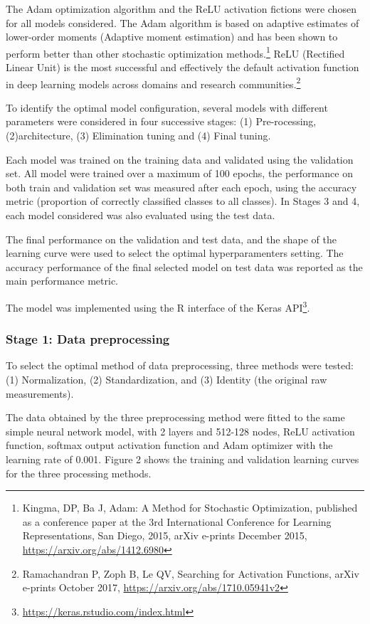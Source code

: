 \documentclass[]{article}
\let\rmarkdownfootnote\footnote%
\def\footnote{\protect\rmarkdownfootnote}
\begin{document}
The Adam optimization algorithm and the ReLU activation fictions were
chosen for all models considered. The Adam algorithm is based on
adaptive estimates of lower-order moments (Adaptive moment estimation)
and has been shown to perform better than other stochastic optimization
methods.\footnote{Kingma, DP, Ba J, Adam: A Method for Stochastic
  Optimization, published as a conference paper at the 3rd International
  Conference for Learning Representations, San Diego, 2015, arXiv
  e-prints December 2015, \url{https://arxiv.org/abs/1412.6980}} ReLU
(Rectified Linear Unit) is the most successful and effectively the
default activation function in deep learning models across domains and
research communities.\footnote{Ramachandran P, Zoph B, Le QV, Searching
  for Activation Functions, arXiv e-prints October 2017,
  \url{https://arxiv.org/abs/1710.05941v2}}

To identify the optimal model configuration, several models with
different parameters were considered in four successive stages: (1)
Pre-rocessing, (2)architecture, (3) Elimination tuning and (4) Final
tuning.

Each model was trained on the training data and validated using the
validation set. All model were trained over a maximum of 100 epochs, the
performance on both train and validation set was measured after each
epoch, using the accuracy metric (proportion of correctly classified
classes to all classes). In Stages 3 and 4, each model considered was
also evaluated using the test data.

The final performance on the validation and test data, and the shape of
the learning curve were used to select the optimal hyperparamenters
setting. The accuracy performance of the final selected model on test
data was reported as the main performance metric.

The model was implemented using the R interface of the Keras
API\footnote{\url{https://keras.rstudio.com/index.html}}.

\hypertarget{stage-1-data-preprocessing}{%
\subsubsection{Stage 1: Data
preprocessing}\label{stage-1-data-preprocessing}}

To select the optimal method of data preprocessing, three methods were
tested: (1) Normalization, (2) Standardization, and (3) Identity (the
original raw measurements).

The data obtained by the three preprocessing method were fitted to the
same simple neural network model, with 2 layers and 512-128 nodes, ReLU
activation function, softmax output activation function and Adam
optimizer with the learning rate of 0.001. Figure 2 shows the training
and validation learning curves for the three processing methods.
\end{document}
